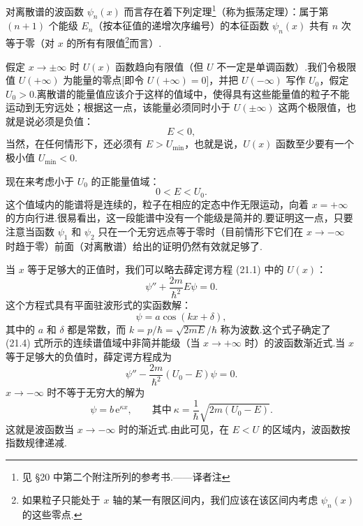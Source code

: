 对离散谱的波函数 $\psi_n(x)$ 而言存在着下列定理\footnote{见 §20 中第二个附注所列的参考书.——译者注}（称为振荡定理）：属于第 $(n+1)$ 个能级 $E_n$（按本征值的递增次序编号）的本征函数 $\psi_n(x)$ 共有 $n$ 次等于零（对 $x$ 的所有有限值\footnote{如果粒子只能处于 $x$ 轴的某一有限区间内，我们应该在该区间内考虑 $\psi_n(x)$ 的这些零点.}而言）.

假定 $x\to\pm\infty$ 时 $U(x)$ 函数趋向有限值（但 $U$ 不一定是单调函数）.我们令极限值 $U(+\infty)$ 为能量的零点[即令 $U(+\infty)=0$]，并把 $U(-\infty)$ 写作 $U_0$，假定 $U_0>0$.离散谱的能量值应该介于这样的值域中，使得具有这些能量值的粒子不能运动到无穷远处；根据这一点，该能量必须同时小于 $U(\pm\infty)$ 这两个极限值，也就是说必须是负值：
\begin{equation}
  E<0,
\end{equation}
当然，在任何情形下，还必须有 $E>U_{\min}$，也就是说，$U(x)$ 函数至少要有一个极小值 $U_{\min}<0$.

现在来考虑小于 $U_0$ 的正能量值域：
\begin{equation}
  0<E<U_0.
\end{equation}
这个值域内的能谱将是连续的，粒子在相应的定态中作无限运动，向着 $x=+\infty$ 的方向行进.很易看出，这一段能谱中没有一个能级是简并的.要证明这一点，只要注意当函数 $\psi_1$ 和 $\psi_2$ 只在一个无穷远点等于零时（目前情形下它们在 $x\to-\infty$ 时趋于零）前面（对离散谱）给出的证明仍然有效就足够了.

当 $x$ 等于足够大的正值时，我们可以略去薛定谔方程 (21.1) 中的 $U(x)$：
\begin{equation*}
  \psi''+\frac{2m}{\hbar^2}E\psi=0.
\end{equation*}
这个方程式具有平面驻波形式的实函数解：
\begin{equation}
  \psi=a\cos\left(kx+\delta\right),
\end{equation}
其中的 $a$ 和 $\delta$ 都是常数，而 $k=p/\hbar=\sqrt{2mE}/\hbar$ 称为波数.这个式子确定了 (21.4) 式所示的连续谱值域中非简并能级（当 $x\to+\infty$ 时）的波函数渐近式.当 $x$ 等于足够大的负值时，薛定谔方程成为
\begin{equation*}
  \psi''-\frac{2m}{\hbar^2}\left(U_0-E\right)\psi=0.
\end{equation*}
$x\to-\infty$ 时不等于无穷大的解为
\begin{equation}
  \psi=b\,\mathrm{e}^{\kappa x},
  \qquad\text{其中}\ \kappa=\frac{1}{\hbar}\sqrt{2m\left(U_0-E\right)}.
\end{equation}
这就是波函数当 $x\to-\infty$ 时的渐近式.由此可见，在 $E<U$ 的区域内，波函数按指数规律递减.

